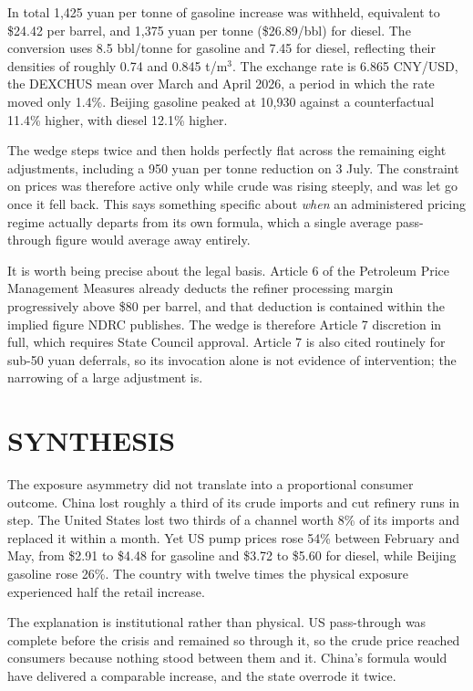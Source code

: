 \documentclass[11pt]{article}
\begin{document}
In total 1,425 yuan per tonne of gasoline increase was
withheld, equivalent to \$24.42 per barrel, and 1,375 yuan per tonne
(\$26.89/bbl) for diesel. The conversion uses 8.5 bbl/tonne for gasoline
and 7.45 for diesel, reflecting their densities of roughly 0.74 and
0.845 t/m$^3$. The exchange rate is 6.865
CNY/USD, the DEXCHUS mean over March and April 2026, a period in which
the rate moved only 1.4\%. Beijing
gasoline peaked at 10,930 against a counterfactual 11.4\% higher, with
diesel 12.1\% higher.

The wedge steps twice and then holds perfectly flat across the remaining
eight adjustments, including a 950 yuan per tonne reduction on 3 July.
The constraint on prices was therefore active only while crude
was rising steeply, and was let go once it fell back. This says
something specific about \emph{when} an administered pricing regime
actually departs from its own formula, which a single average
pass-through figure would average away entirely.

It is worth being precise about the legal basis. Article 6 of the
Petroleum Price Management Measures already deducts the refiner
processing margin progressively above \$80 per barrel, and that
deduction is contained within the implied figure NDRC publishes. The
wedge is therefore Article 7 discretion in full, which requires State
Council approval. Article 7 is also cited routinely for sub-50 yuan
deferrals, so its invocation alone is not evidence of intervention; the
narrowing of a large adjustment is.

\section{SYNTHESIS}

The exposure asymmetry did not translate into a proportional consumer
outcome. China lost roughly a third of its crude imports and cut
refinery runs in step. The United States lost two thirds of a channel
worth 8\% of its imports and replaced it within a month. Yet US pump
prices rose 54\% between February and May, from \$2.91 to \$4.48 for
gasoline and \$3.72 to \$5.60 for diesel, while Beijing gasoline rose
26\%. The country with twelve times the physical exposure experienced
half the retail increase.

The explanation is institutional rather than physical. US pass-through
was complete before the crisis and remained so through it, so the crude
price reached consumers because nothing stood between them and it.
China's formula would have delivered a comparable increase, and the
state overrode it twice.
\end{document}
